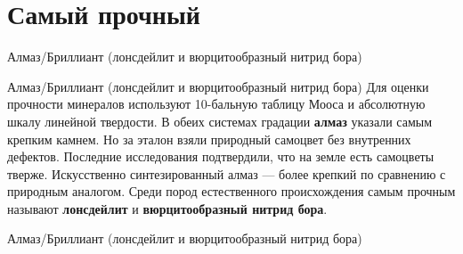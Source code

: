 \documentclass{beamer}
\begin{document}
\section{Самый прочный}
	\begin{frame}[c]{Алмаз/Бриллиант (лонсдейлит и вюрцитообразный нитрид бора)}
	\end{frame}

	\begin{frame}[t]{Алмаз/Бриллиант (лонсдейлит и вюрцитообразный нитрид бора)}
		\text{\qquad}
			Для оценки прочности минералов используют 10-бальную таблицу Мооса и абсолютную шкалу линейной твердости. В обеих системах градации \textbf{алмаз} указали самым крепким камнем. Но за эталон взяли природный самоцвет без внутренних дефектов.
		\newline
		\text{\qquad}
			Последние исследования подтвердили, что на земле есть самоцветы тверже. Искусственно синтезированный алмаз — более крепкий по сравнению с природным аналогом. Среди пород естественного происхождения самым прочным называют \textbf{лонсдейлит} и \textbf{вюрцитообразный нитрид бора}.
	\end{frame}

	\begin{frame}[c]{Алмаз/Бриллиант (лонсдейлит и вюрцитообразный нитрид бора)}
	\end{frame}
\end{document}

